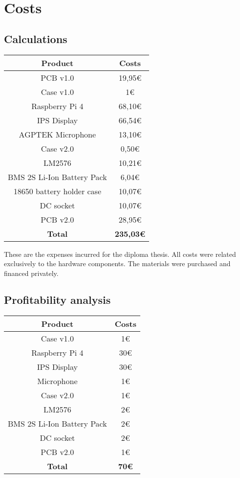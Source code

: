 \renewcommand*\chapterpagestyle{scrheadings}
\chapter{Costs}

\section{Calculations}

\begin{tabular}{|c|c|}
  \hline
  \textbf{Product} & \textbf{Costs} \\ \hline
  PCB v1.0 & 19,95€ \\ \hline
  Case v1.0 & 1€ \\ \hline
  Raspberry Pi 4 & 68,10€ \\ \hline
  IPS Display & 66,54€ \\ \hline
  AGPTEK Microphone & 13,10€ \\ \hline
  Case v2.0 & 0,50€ \\ \hline
  LM2576 & 10,21€ \\ \hline
  BMS 2S Li-Ion Battery Pack & 6,04€ \\ \hline
  18650 battery holder case & 10,07€ \\ \hline
  DC socket & 10,07€ \\ \hline
  PCB v2.0 & 28,95€ \\ \hline
  \textbf{Total} & \textbf{235,03€} \\ \hline

\end{tabular}

\vspace{0,5cm}
These are the expenses incurred for the diploma thesis. All costs were related exclusively to the hardware components. The materials were purchased and financed privately.


\section{Profitability analysis}

\begin{tabular}{|c|c|}
  \hline
  \textbf{Product} & \textbf{Costs} \\ \hline
  Case v1.0 & 1€ \\ \hline
  Raspberry Pi 4 & 30€ \\ \hline
  IPS Display & 30€ \\ \hline
  Microphone & 1€ \\ \hline
  Case v2.0 & 1€ \\ \hline
  LM2576 & 2€ \\ \hline
  BMS 2S Li-Ion Battery Pack & 2€ \\ \hline
  DC socket & 2€ \\ \hline
  PCB v2.0 & 1€ \\ \hline
  \textbf{Total} & \textbf{70€} \\ \hline

\end{tabular}


